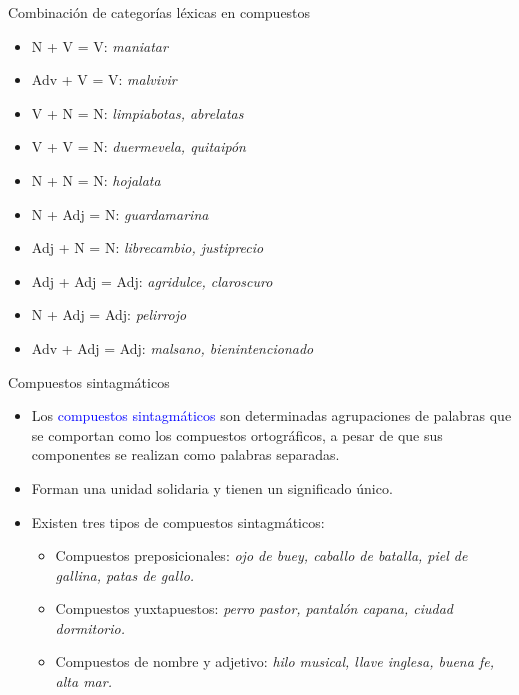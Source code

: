 \documentclass{beamer}
\begin{document}
\begin{frame}{Combinación de categorías léxicas en compuestos}

\begin{itemize}
	\item N + V = V: \it{maniatar}
	\item Adv + V = V: \it{malvivir}
	\item V + N = N: \it{limpiabotas, abrelatas}
	\item V + V = N: \it{duermevela, quitaipón}
	\item N + N = N: \it{hojalata}
	\item N + Adj = N: \it{guardamarina}
	\item Adj + N = N: \it{librecambio, justiprecio}
	\item Adj + Adj = Adj: \it{agridulce, claroscuro}
	\item N + Adj = Adj: \it{pelirrojo}
	\item Adv + Adj = Adj: \it{malsano, bienintencionado}
\end{itemize}
	
\end{frame}

\begin{frame}{Compuestos sintagmáticos}

\begin{itemize}
	\item Los \textcolor{blue}{compuestos sintagmáticos} son determinadas agrupaciones de palabras que se comportan como los compuestos ortográficos, a pesar de que sus componentes se realizan como palabras separadas.
	\item Forman una unidad solidaria y tienen un significado único. 
	\item Existen tres tipos de compuestos sintagmáticos:
	\begin{itemize}
		\item Compuestos preposicionales: \it{ojo de buey, caballo de batalla, piel de gallina, patas de gallo}.
		\item Compuestos yuxtapuestos: \it{perro pastor, pantalón capana, ciudad dormitorio}.
		\item Compuestos de nombre y adjetivo: \it{hilo musical, llave inglesa, buena fe, alta mar}.
	\end{itemize}
\end{itemize}
	

\end{frame}
\end{document}
